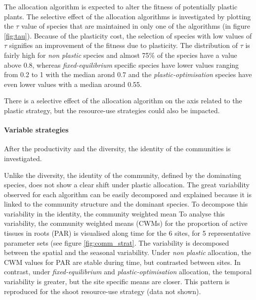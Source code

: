 The allocation algorithm is expected to alter the fitness of potentially plastic plants. The selective effect of the allocation algorithms is investigated by plotting the $\tau$ value of species that are maintained in only one of the algorithms (in figure \ref{fig:tau}). Because of the plasticity cost, the selection of species with low values of $\tau$ signifies an improvement of the fitness due to plasticity. The distribution of $\tau$ is fairly high for \textit{non plastic} species and almost 75\% of the species have a value above 0.8, whereas \textit{fixed-equilibrium} specific species have lower values ranging from 0.2 to 1 with the median arond 0.7 and the \textit{plastic-optimisation} species have even lower values with a median around 0.55.



There is a selective effect of the allocation algorithm on the axis related to the plastic strategy, but the resource-use strategies could also be impacted.


\paragraph{Variable strategies}

After the productivity and the diversity, the identity of the communities is investigated.

Unlike the diversity, the identity of the community, defined by the dominating species, does not show a clear shift under plastic allocation. The great variability observed for each algorithm can be easily decomposed and explained because it is linked to the community structure and the dominant species. To decompose this variability in the identity, the community weighted mean 
To analyse this variability, the community weighted means (CWMs) for the proportion of active tissues in roots (PAR) is visualised along time for the 6 sites, for 5 representative parameter sets (see figure \ref{fig:comm_strat}. The variability is decomposed between the spatial and the seasonal variability. Under \textit{non plastic} allocation, the CWM values for PAR are stable during time, but contrasted between sites. In contrast, under \textit{fixed-equilibrium} and \textit{plastic-optimisation} allocation, the temporal variability is greater, but the site specific means are closer. This pattern is reproduced for the shoot resource-use strategy (data not shown).


